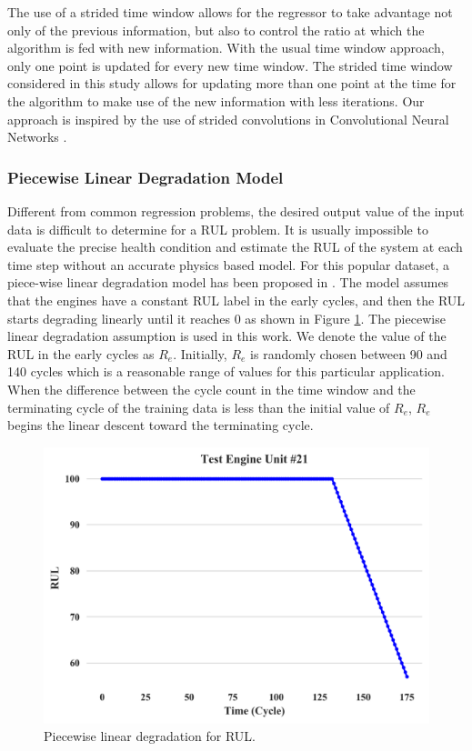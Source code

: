 \documentclass[preprint,12pt]{elsarticle}%
\begin{document}
\pagebreak

The use of a strided time window allows for the regressor to take advantage
not only of the previous information, but also to control the ratio at which
the algorithm is fed with new information. With the usual time window
approach, only one point is updated for every new time window. The strided
time window considered in this study allows for updating more than one point
at the time for the algorithm to make use of the new information with less iterations. Our approach is inspired by the use of strided convolutions in Convolutional Neural Networks \cite{Kong2017}.

\subsubsection{Piecewise Linear Degradation Model}

Different from common regression problems, the desired output value of the
input data is difficult to determine for a RUL problem. It is usually
impossible to evaluate the precise health condition and estimate the RUL of
the system at each time step without an accurate physics based model. For this
popular dataset, a piece-wise linear degradation model has been proposed in
\cite{Ramasso2014}. The model assumes that the engines have a constant RUL
label in the early cycles, and then the RUL starts degrading linearly until it
reaches 0 as shown in Figure \ref{FigRULinear}. The piecewise linear
degradation assumption is used in this work. We denote the value of the RUL in
the early cycles as $R_{e}$. Initially,  $R_{e}$ is randomly chosen between 90 and 140 
cycles which is a reasonable range of values for this particular application. When the difference between the cycle count in the time window and the terminating cycle 
of the training data is less than the initial value of $R_{e}$, $R_{e}$ begins the linear 
descent toward the terminating cycle.

\begin{figure}[!htb]
\begin{center}
\includegraphics[scale=0.5]{Figures/test_engine.png}
\caption{Piecewise linear degradation for RUL.}
\label{FigRULinear}
\end{center}
\end{figure}
\end{document}
